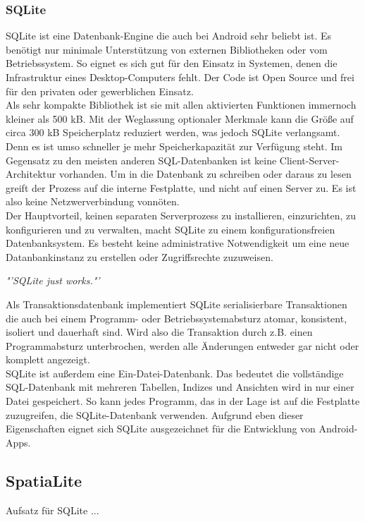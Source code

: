 \subsubsection{SQLite}
SQLite ist eine Datenbank-Engine die auch bei Android sehr beliebt ist. Es benötigt nur minimale Unterstützung von externen Bibliotheken oder vom Betriebssystem. So eignet es sich gut für den Einsatz in Systemen, denen die Infrastruktur eines Desktop-Computers fehlt. Der Code ist Open Source und frei für den privaten oder gewerblichen Einsatz.\\
Als sehr kompakte Bibliothek ist sie mit allen aktivierten Funktionen immernoch kleiner als 500 kB. Mit der Weglassung optionaler Merkmale kann die Größe auf circa 300 kB Speicherplatz reduziert werden, was jedoch SQLite verlangsamt. Denn es ist umso schneller je mehr Speicherkapazität zur Verfügung steht.
Im Gegensatz zu den meisten anderen \gls{SQL}-Datenbanken ist keine Client-Server-Architektur vorhanden. Um in die Datenbank zu schreiben oder daraus zu lesen greift der Prozess auf die interne Festplatte, und nicht auf einen Server zu. Es ist also keine Netzwerverbindung vonnöten. \\
Der Hauptvorteil, keinen separaten Serverprozess zu installieren, einzurichten, zu konfigurieren und zu verwalten, macht SQLite zu einem konfigurationsfreien Datenbanksystem. Es besteht keine administrative Notwendigkeit um eine neue Datanbankinstanz zu erstellen oder Zugriffsrechte zuzuweisen. 
\begin{center}
\textit{\color{gray}"'SQLite just works."'}\hspace{9pt}\cite{sqlitea}
\end{center}
Als Transaktionsdatenbank implementiert SQLite serialisierbare Transaktionen die auch bei einem Programm- oder Betriebssystemabsturz atomar, konsistent, isoliert und dauerhaft sind. Wird also die Transaktion durch z.B. einen Programmabsturz unterbrochen, werden alle Änderungen entweder gar nicht oder komplett angezeigt.\\ 
SQLite ist außerdem eine Ein-Datei-Datenbank. Das bedeutet die vollständige \gls{SQL}-Datenbank mit mehreren Tabellen, Indizes und Ansichten wird in nur einer Datei gespeichert. So kann jedes Programm, das in der Lage ist auf die Festplatte zuzugreifen, die SQLite-Datenbank verwenden. \cite{sqlite} Aufgrund eben dieser Eigenschaften eignet sich SQLite ausgezeichnet für die Entwicklung von Android-\glspl{App}.
\subsection{SpatiaLite}
Aufsatz für SQLite ...
